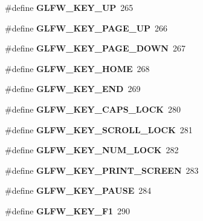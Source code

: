 \begin{DoxyCompactItemize}
\#define {\bfseries G\+L\+F\+W\+\_\+\+K\+E\+Y\+\_\+\+UP}~265
\item 
\mbox{\label{group__keys_ga3ab731f9622f0db280178a5f3cc6d586}} 
\#define {\bfseries G\+L\+F\+W\+\_\+\+K\+E\+Y\+\_\+\+P\+A\+G\+E\+\_\+\+UP}~266
\item 
\mbox{\label{group__keys_gaee0a8fa442001cc2147812f84b59041c}} 
\#define {\bfseries G\+L\+F\+W\+\_\+\+K\+E\+Y\+\_\+\+P\+A\+G\+E\+\_\+\+D\+O\+WN}~267
\item 
\mbox{\label{group__keys_ga41452c7287195d481e43207318c126a7}} 
\#define {\bfseries G\+L\+F\+W\+\_\+\+K\+E\+Y\+\_\+\+H\+O\+ME}~268
\item 
\mbox{\label{group__keys_ga86587ea1df19a65978d3e3b8439bedd9}} 
\#define {\bfseries G\+L\+F\+W\+\_\+\+K\+E\+Y\+\_\+\+E\+ND}~269
\item 
\mbox{\label{group__keys_ga92c1d2c9d63485f3d70f94f688d48672}} 
\#define {\bfseries G\+L\+F\+W\+\_\+\+K\+E\+Y\+\_\+\+C\+A\+P\+S\+\_\+\+L\+O\+CK}~280
\item 
\mbox{\label{group__keys_gaf622b63b9537f7084c2ab649b8365630}} 
\#define {\bfseries G\+L\+F\+W\+\_\+\+K\+E\+Y\+\_\+\+S\+C\+R\+O\+L\+L\+\_\+\+L\+O\+CK}~281
\item 
\mbox{\label{group__keys_ga3946edc362aeff213b2be6304296cf43}} 
\#define {\bfseries G\+L\+F\+W\+\_\+\+K\+E\+Y\+\_\+\+N\+U\+M\+\_\+\+L\+O\+CK}~282
\item 
\mbox{\label{group__keys_gaf964c2e65e97d0cf785a5636ee8df642}} 
\#define {\bfseries G\+L\+F\+W\+\_\+\+K\+E\+Y\+\_\+\+P\+R\+I\+N\+T\+\_\+\+S\+C\+R\+E\+EN}~283
\item 
\mbox{\label{group__keys_ga8116b9692d87382afb5849b6d8907f18}} 
\#define {\bfseries G\+L\+F\+W\+\_\+\+K\+E\+Y\+\_\+\+P\+A\+U\+SE}~284
\item 
\mbox{\label{group__keys_gafb8d66c573acf22e364049477dcbea30}} 
\#define {\bfseries G\+L\+F\+W\+\_\+\+K\+E\+Y\+\_\+\+F1}~290
\item 
\mbox{\label{group__keys_ga0900750aff94889b940f5e428c07daee}} 

\end{DoxyCompactItemize}
